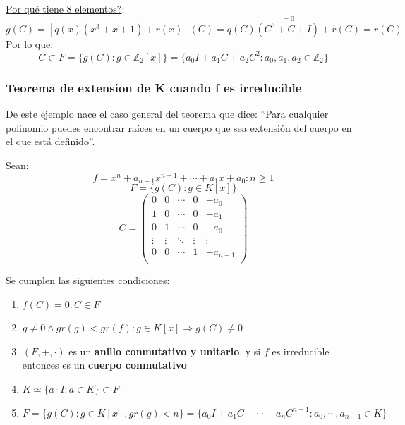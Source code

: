 \documentclass[10pt,a4paper,openright]{book}
\theoremstyle{break}
\begin{document}
\underline{Por qué tiene 8 elementos?}:
$$g(C)=[q(x)(x^3+x+1)+r(x)](C)=q(C)\stackrel{=0}{(C^3+C+I)}+r(C)=r(C)$$
Por lo que:
$$C\subset F=\{g(C): g\in \mathbb Z_2[x]\}=\{a_0I+a_1C+a_2C^2: a_0,a_1,a_2\in \mathbb Z_2\}$$

\subsubsection*{Teorema de extension de K cuando f es irreducible}
De este ejemplo nace el caso general del teorema que dice: ``Para cualquier polinomio puedes encontrar raíces en un cuerpo que sea extensión del cuerpo en el que está definido''.\par
Sean:
$$f=x^n+a_{n-1}x^{n-1}+\cdots+a_1x+a_0: n\geq 1$$
$$F=\{g(C): g\in K[x]\}$$
$$C=\left(\begin{array}{ccccc}
0 & 0 & \cdots & 0 & -a_0 \\
1 & 0 & \cdots & 0 & -a_1 \\
0 & 1 & \cdots & 0 & -a_0 \\
\vdots & \vdots & \ddots & \vdots & \vdots \\
0 & 0 & \cdots & 1 & -a_{n-1}\\
\end{array}\right)$$

Se cumplen las siguientes condiciones:
\begin{enumerate}
\item $f(C)=0: C\in F$
\item $g\neq 0 \wedge gr(g)<gr(f): g\in K[x]\Rightarrow g(C)\neq 0$
\item $(F,+,\cdot)$ es un \textbf{anillo conmutativo y unitario}, y si $f$ es irreducible entonces es un \textbf{cuerpo conmutativo}
\item $K\simeq \{a\cdot I: a\in K\}\subset F$
\item $F=\{g(C): g\in K[x], gr(g)<n\}=\{a_0I+a_1C+\cdots+a_nC^{n-1}: a_0,\cdots,a_{n-1}\in K\}$
\end{enumerate}
\end{document}
